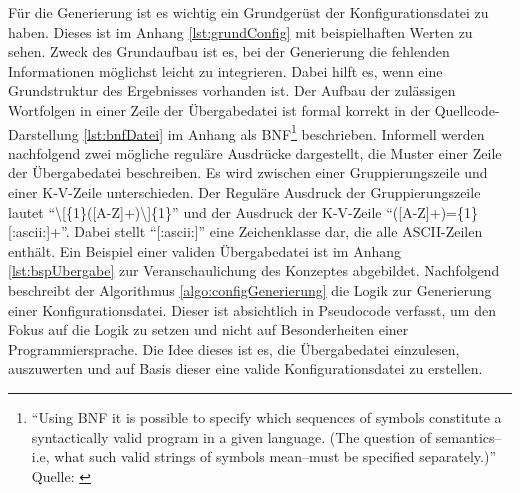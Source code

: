 Für die Generierung ist es wichtig ein Grundgerüst der Konfigurationsdatei zu haben. Dieses ist im Anhang \vref{lst:grundConfig} mit beispielhaften Werten zu sehen. Zweck des Grundaufbau ist es, bei der Generierung die fehlenden Informationen möglichst leicht zu integrieren. Dabei hilft es, wenn eine Grundstruktur des Ergebnisses vorhanden ist. Der Aufbau der zulässigen Wortfolgen in einer Zeile der Übergabedatei ist formal korrekt in der Quellcode-Darstellung \vref{lst:bnfDatei} im Anhang als \ac{BNF}\footnote{\enquote{Using BNF it is possible to specify which sequences of symbols constitute a syntactically valid program in a given language. (The question of semantics--i.e, what such valid strings of symbols mean--must be specified separately.)} Quelle: \cite[][]{mccracken_backus-naur_2003}} beschrieben. Informell werden nachfolgend zwei mögliche reguläre Ausdrücke dargestellt, die Muster einer Zeile der Übergabedatei beschreiben. Es wird zwischen einer Gruppierungszeile und einer \ac{K-V}-Zeile unterschieden. Der Reguläre Ausdruck der Gruppierungszeile lautet \enquote{\textbackslash[\{1\}([A-Z]+)\textbackslash]\{1\}} und der Ausdruck der \ac{K-V}-Zeile \enquote{([A-Z]+)=\{1\}[:ascii:]+}. Dabei stellt \enquote{[:ascii:]} eine Zeichenklasse dar, die alle \textsc{ASCII}-Zeilen enthält. Ein Beispiel einer validen Übergabedatei ist im Anhang \ref{lst:bspUbergabe} zur Veranschaulichung des Konzeptes abgebildet. Nachfolgend beschreibt der Algorithmus \ref{algo:configGenerierung} die Logik zur Generierung einer Konfigurationsdatei. Dieser ist absichtlich in Pseudocode verfasst, um den Fokus auf die Logik zu setzen und nicht auf Besonderheiten einer Programmiersprache. Die Idee dieses ist es, die Übergabedatei einzulesen, auszuwerten und auf Basis dieser eine valide Konfigurationsdatei zu erstellen.


